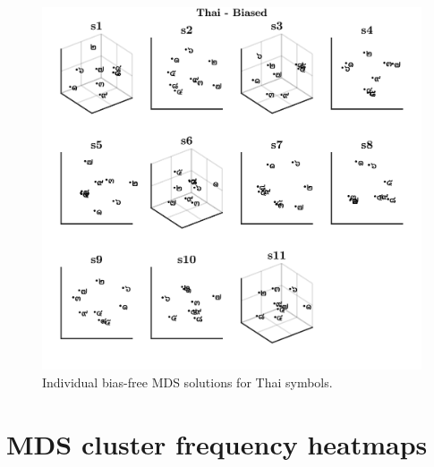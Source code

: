 \begin{figure}[tbh]
\centering \includegraphics[scale = .67]{Figures/Appendix/AppD/Indiv_MDS_4_Biased.jpg}
\caption{Individual bias-free MDS solutions for Thai symbols.}
\label{fig:Apx_MDSthaiBiased}
\end{figure}


\clearpage
\section{MDS cluster frequency heatmaps}
\label{Appendix:Cluster1}

